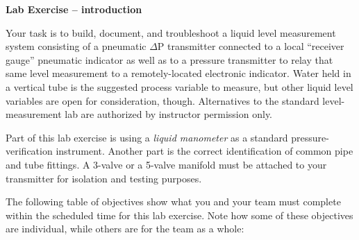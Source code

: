

\noindent
{\bf Lab Exercise -- introduction}

\vskip 5pt

Your task is to build, document, and troubleshoot a liquid level measurement system consisting of a pneumatic $\Delta$P transmitter connected to a local ``receiver gauge'' pneumatic indicator as well as to a pressure transmitter to relay that same level measurement to a remotely-located electronic indicator.  Water held in a vertical tube is the suggested process variable to measure, but other liquid level variables are open for consideration, though.  Alternatives to the standard level-measurement lab are authorized by instructor permission only.

Part of this lab exercise is using a {\it liquid manometer} as a standard pressure-verification instrument.  Another part is the correct identification of common pipe and tube fittings.  A 3-valve or a 5-valve manifold must be attached to your transmitter for isolation and testing purposes.

The following table of objectives show what you and your team must complete within the scheduled time for this lab exercise.  Note how some of these objectives are individual, while others are for the team as a whole:




